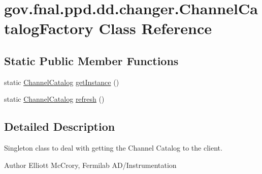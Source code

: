 \hypertarget{classgov_1_1fnal_1_1ppd_1_1dd_1_1changer_1_1ChannelCatalogFactory}{\section{gov.\-fnal.\-ppd.\-dd.\-changer.\-Channel\-Catalog\-Factory Class Reference}
\label{classgov_1_1fnal_1_1ppd_1_1dd_1_1changer_1_1ChannelCatalogFactory}
}
\subsection*{Static Public Member Functions}
\begin{DoxyCompactItemize}
\item 
static \hyperlink{interfacegov_1_1fnal_1_1ppd_1_1dd_1_1changer_1_1ChannelCatalog}{Channel\-Catalog} \hyperlink{classgov_1_1fnal_1_1ppd_1_1dd_1_1changer_1_1ChannelCatalogFactory_ac77dd407ecb474093b11431593b52540}{get\-Instance} ()
\item 
static \hyperlink{interfacegov_1_1fnal_1_1ppd_1_1dd_1_1changer_1_1ChannelCatalog}{Channel\-Catalog} \hyperlink{classgov_1_1fnal_1_1ppd_1_1dd_1_1changer_1_1ChannelCatalogFactory_a10180eb261e098698ee6c87b0d530380}{refresh} ()
\end{DoxyCompactItemize}


\subsection{Detailed Description}
Singleton class to deal with getting the Channel Catalog to the client.

\begin{DoxyAuthor}{Author}
Elliott Mc\-Crory, Fermilab A\-D/\-Instrumentation 
\end{DoxyAuthor}



